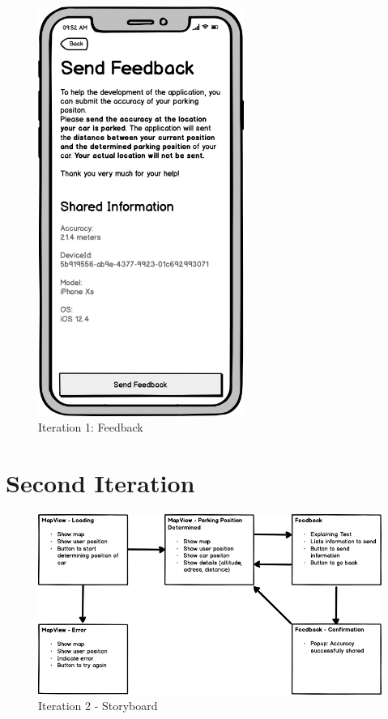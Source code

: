 \begin{figure}[H]
  \centering
  \begin{minipage}[b]{0.45\textwidth}
    \centering
    \includegraphics[width=0.6\textwidth]{images/UI/Iteration1-Feedback.png}
    \caption{Iteration 1: Feedback}
    \label{fig:i1-feedback}
  \end{minipage}
  \hfill
  \begin{minipage}[b]{0.45\textwidth}
    
  \end{minipage}
\end{figure}



\section{Second Iteration}

\begin{figure}[H]
    \centering
    \includegraphics[width=\textwidth]{images/UI/Iteration2-Overview.png}
    \caption{Iteration 2 - Storyboard}
    \label{fig:i2story}
\end{figure}

